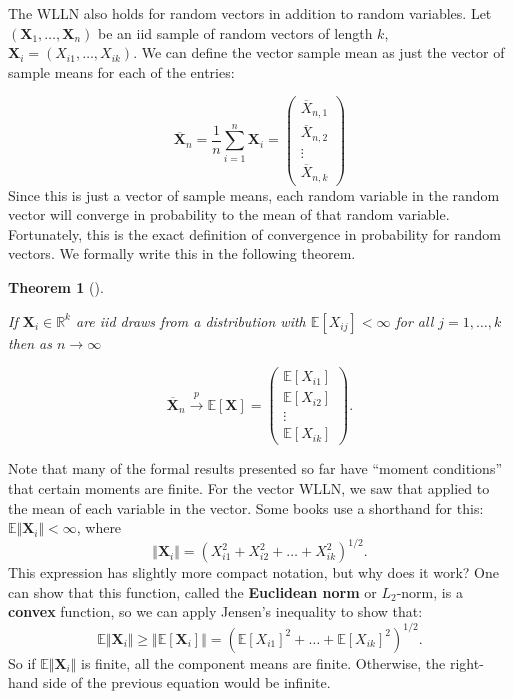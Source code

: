 \documentclass[
  letterpaper,
  DIV=11,
  numbers=noendperiod]{scrreprt}
\newcommand{\mb}{\symbf}
\newcommand{\E}{\mathbb{E}}
\newcommand{\Xbar}{\overline{X}}
\newcommand{\X}{\mb{X}}
\newcommand{\inprob}{\overset{p}{\to}}
\theoremstyle{definition}
\theoremstyle{definition}
\theoremstyle{plain}
\newtheorem{theorem}{Theorem}[chapter]
\theoremstyle{remark}
\begin{document}
The WLLN also holds for random vectors in addition to random variables.
Let \((\X_1, \ldots, \X_n)\) be an iid sample of random vectors of
length \(k\), \(\mb{X}_i = (X_{i1}, \ldots, X_{ik})\). We can define the
vector sample mean as just the vector of sample means for each of the
entries:

\[
\overline{\mb{X}}_n = \frac{1}{n} \sum_{i=1}^n \mb{X}_i =
\begin{pmatrix}
\Xbar_{n,1} \\ \Xbar_{n,2} \\ \vdots \\ \Xbar_{n, k}
\end{pmatrix}
\] Since this is just a vector of sample means, each random variable in
the random vector will converge in probability to the mean of that
random variable. Fortunately, this is the exact definition of
convergence in probability for random vectors. We formally write this in
the following theorem.

\begin{theorem}[]\protect\hypertarget{thm-vector-wlln}{}\label{thm-vector-wlln}

If \(\X_i \in \mathbb{R}^k\) are iid draws from a distribution with
\(\E[X_{ij}] < \infty\) for all \(j=1,\ldots,k\) then as
\(n\rightarrow\infty\)

\[
\overline{\mb{X}}_n \inprob \E[\X] =
\begin{pmatrix}
\E[X_{i1}] \\ \E[X_{i2}] \\ \vdots \\ \E[X_{ik}]
\end{pmatrix}.
\]

\end{theorem}

\begin{tcolorbox}[enhanced jigsaw, colbacktitle=quarto-callout-note-color!10!white, breakable, toptitle=1mm, opacityback=0, leftrule=.75mm, rightrule=.15mm, coltitle=black, opacitybacktitle=0.6, toprule=.15mm, arc=.35mm, bottomtitle=1mm, titlerule=0mm, title=\textcolor{quarto-callout-note-color}{\faInfo}\hspace{0.5em}{Notation alert}, colframe=quarto-callout-note-color-frame, bottomrule=.15mm, colback=white, left=2mm]

Note that many of the formal results presented so far have ``moment
conditions'' that certain moments are finite. For the vector WLLN, we
saw that applied to the mean of each variable in the vector. Some books
use a shorthand for this: \(\E\Vert \X_i\Vert < \infty\), where \[
\Vert\X_i\Vert = \left(X_{i1}^2 + X_{i2}^2 + \ldots + X_{ik}^2\right)^{1/2}. 
\] This expression has slightly more compact notation, but why does it
work? One can show that this function, called the \textbf{Euclidean
norm} or \(L_2\)-norm, is a \textbf{convex} function, so we can apply
Jensen's inequality to show that: \[
\E\Vert \X_i\Vert \geq \Vert \E[\X_i] \Vert = (\E[X_{i1}]^2 + \ldots + \E[X_{ik}]^2)^{1/2}.
\] So if \(\E\Vert \X_i\Vert\) is finite, all the component means are
finite. Otherwise, the right-hand side of the previous equation would be
infinite.

\end{tcolorbox}
\end{document}
